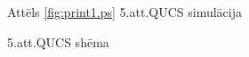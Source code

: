 \documentclass{report}
\begin{document}
{\begin{figure}[!h]
\begin{center}
\caption{5.att.QUCS shēma}
\label{fig:01.ps}
Attēls \ref{fig:print1.ps} 5.att.QUCS simulācija
\end{center}
\end{figure}

}
\end{document}
